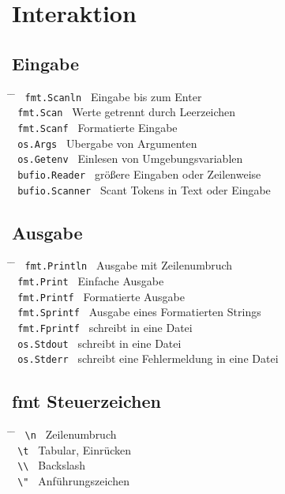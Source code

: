 \documentclass[twoside,a4paper,12pt]{article}
\begin{document}
\section{Interaktion}
\subsection{Eingabe}
\begin{tabbing}
  \hspace{2mm} \= \hspace{70mm} \= \kill
  \> \verb| fmt.Scanln | \> Eingabe bis zum Enter \\  
  \> \verb| fmt.Scan | \> Werte getrennt durch Leerzeichen \\ 
  \> \verb| fmt.Scanf | \> Formatierte Eingabe \\ 
  \> \verb| os.Args | \> Ubergabe von Argumenten \\ 
  \> \verb| os.Getenv | \> Einlesen von Umgebungsvariablen \\
  \> \verb| bufio.Reader | \> größere Eingaben oder Zeilenweise \\ 
  \> \verb| bufio.Scanner | \>  Scant Tokens in Text oder Eingabe \\
\end{tabbing}
\subsection{Ausgabe}
\begin{tabbing}
  \hspace{2mm} \= \hspace{70mm} \= \kill
  \> \verb| fmt.Println | \> Ausgabe mit Zeilenumbruch \\ 
  \> \verb| fmt.Print | \> Einfache Ausgabe \\ 
  \> \verb| fmt.Printf | \> Formatierte Ausgabe \\ 
  \> \verb| fmt.Sprintf | \> Ausgabe eines Formatierten Strings \\ 
  \> \verb| fmt.Fprintf | \> schreibt in eine Datei \\ 
  \> \verb| os.Stdout | \> schreibt in eine Datei \\ 
  \> \verb| os.Stderr | \> schreibt eine Fehlermeldung in eine Datei \\ 
\end{tabbing}
\subsection{fmt Steuerzeichen}
\begin{tabbing}
  \hspace{2mm} \= \hspace{70mm} \= \kill
  \> \verb| \n | \> Zeilenumbruch \\ 
  \> \verb| \t | \> Tabular, Einrücken \\ 
  \> \verb| \\ | \> Backslash \\ 
  \> \verb| \" | \> Anführungszeichen \\ 
\end{tabbing}
\end{document}
